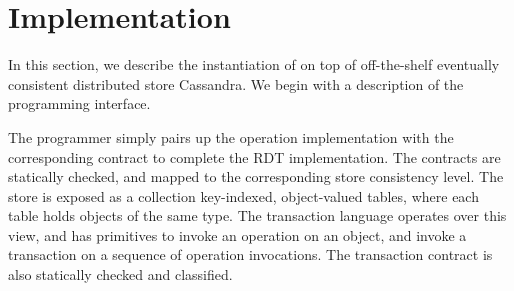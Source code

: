 \section{Implementation}

In this section, we describe the instantiation of \name on top of off-the-shelf
eventually consistent distributed store Cassandra. We begin with a description
of the programming interface.

The programmer simply pairs up the operation implementation with the
corresponding contract to complete the RDT implementation. The contracts are
statically checked, and mapped to the corresponding store consistency level.
The store is exposed as a collection key-indexed, object-valued tables, where
each table holds objects of the same type. The transaction language operates
over this view, and has primitives to invoke an operation on an object, and
invoke a transaction on a sequence of operation invocations. The transaction
contract is also statically checked and classified.
